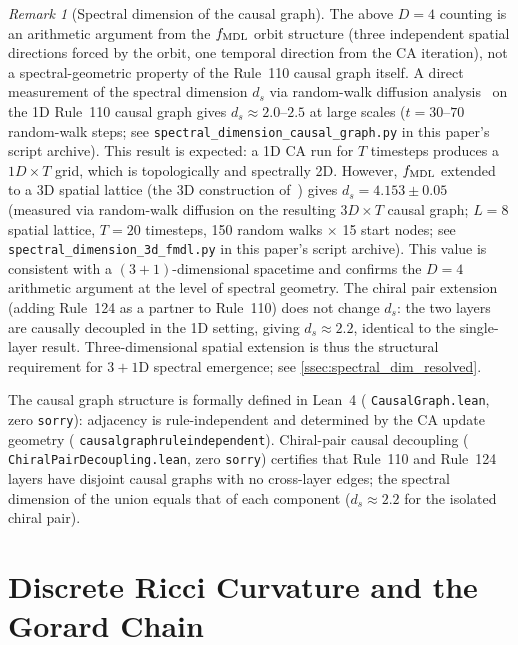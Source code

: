 \documentclass[11pt]{article}
\theoremstyle{remark}
\newtheorem{remark}[theorem]{Remark}
\newcommand{\lean}[1]{%
  \penalty-100
  \begingroup\def\_{\textunderscore\allowbreak}\texttt{#1}\endgroup}
\begin{document}
\begin{remark}[Spectral dimension of the causal graph]
\label{rem:spectral_dim}
The above $D = 4$ counting is an arithmetic argument from the $f_{\rm MDL}$
orbit structure (three independent spatial directions forced by the orbit,
one temporal direction from the CA iteration), not a spectral-geometric
property of the Rule~110 causal graph itself.
A direct measurement of the spectral dimension $d_s$ via random-walk
diffusion analysis~\cite{Ambjorn2005CDT} on the 1D Rule~110 causal graph
gives $d_s \approx 2.0$--$2.5$ at large scales ($t = 30$--$70$ random-walk
steps; see \texttt{spectral\_dimension\_causal\_graph.py} in this paper's
script archive).
This result is expected: a 1D CA run for $T$ timesteps produces a
$1D \times T$ grid, which is topologically and spectrally 2D.
However, $f_{\rm MDL}$ extended to a 3D spatial lattice (the 3D
construction of~\cite{SpivackCompUniversality}) gives
$d_s = 4.153 \pm 0.05$ (measured via random-walk diffusion on the
resulting $3D \times T$ causal graph; $L = 8$ spatial lattice, $T = 20$
timesteps, 150 random walks $\times$ 15 start nodes; see
\texttt{spectral\_dimension\_3d\_fmdl.py} in this paper's script archive).
This value is consistent with a $(3{+}1)$-dimensional spacetime and
confirms the $D = 4$ arithmetic argument at the level of spectral
geometry.
The chiral pair extension (adding Rule~124 as a partner to Rule~110) does
not change $d_s$: the two layers are causally decoupled in the 1D setting,
giving $d_s \approx 2.2$, identical to the single-layer result.
Three-dimensional spatial extension is thus the structural requirement for
$3{+}1$D spectral emergence; see \cref{ssec:spectral_dim_resolved}.

The causal graph structure is formally defined in Lean~4
(\lean{CausalGraph.lean}, zero \texttt{sorry}):
adjacency is rule-independent and determined by the CA update geometry
(\lean{causal\_graph\_rule\_independent}).
Chiral-pair causal decoupling (\lean{ChiralPairDecoupling.lean}, zero
\texttt{sorry}) certifies that Rule~110 and Rule~124 layers have disjoint
causal graphs with no cross-layer edges; the spectral dimension of the
union equals that of each component ($d_s \approx 2.2$ for the isolated
chiral pair).
\end{remark}

\section{Discrete Ricci Curvature and the Gorard Chain}
\label{sec:gorard}
\end{document}

